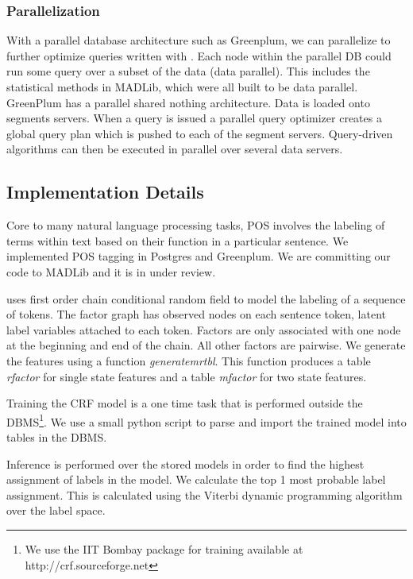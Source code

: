\subsubsection*{Parallelization}
With a parallel database architecture such as 
Greenplum, we can parallelize to further optimize queries written
with {\system}. Each node within the parallel DB could run some query
over a subset of the data (data parallel). This includes the statistical methods
in MADLib, which were all built to be data parallel.
GreenPlum has a parallel shared nothing architecture. Data is loaded onto 
segments servers. When a query is issued a parallel query optimizer 
creates a global query plan which is pushed to each of the segment servers.
Query-driven algorithms can then be executed in parallel over several
data servers.


\subsection{Implementation Details}
\label{sec:impdis}


Core to many natural language processing tasks, POS involves the
labeling of terms within text based on their function in a particular sentence.
We implemented POS tagging in Postgres and Greenplum. We are
committing our code to MADLib and it is in under review.

\system uses first order chain conditional random field to model the labeling
of a sequence of tokens. The factor graph has observed nodes on each sentence
token, latent label variables attached to each token.
Factors are only associated with one node at the beginning and end of the chain.
All other factors are pairwise.  
We generate the features using a function \textit{generatemrtbl}. 
This function produces a table \textit{rfactor} for single state features and a 
table \textit{mfactor} for two state features.

Training the CRF model is a one time task that is performed outside the 
DBMS\footnote{We use the IIT Bombay package for training available at 
http://crf.sourceforge.net }.
We use a small python script to parse and import the trained model into 
tables in the DBMS. 

Inference is performed over the stored models in order to find the highest 
assignment of labels in the model.
We calculate the top 1 most probable label assignment. This is calculated using
the Viterbi dynamic programming algorithm over the label space.


